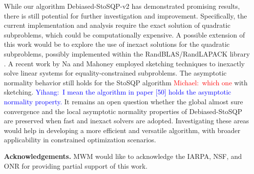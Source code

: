 \documentclass[aos]{imsart}
\numberwithin{equation}{section}
\theoremstyle{plain}
\newcommand{\michael}[1]{\textcolor{red}{Michael:\ #1}}
\newcommand{\yihang}[1]{\textcolor{blue}{Yihang:\ #1}}
\begin{document}
While our algorithm Debiased-StoSQP-v2 has demonstrated promising results, there is still potential for further investigation and improvement. 
Specifically, the current implementation and analysis require the exact solution of quadratic subproblems, which could be computationally expensive. 
A possible extension of this work would be to explore the use of inexact solutions for the quadratic subproblems, possibly implemented within the RandBLAS/RandLAPACK library \cite{randlapack_book_v2_arxiv}. 
A recent work by Na and Mahoney \cite{na2022asymptotic} employed sketching techniques to inexactly solve linear systems for equality-constrained subproblems. 
The asymptotic normality behavior still holds for the StoSQP algorithm 
\michael{which one}
with sketching. 
\yihang{I mean the algorithm in paper [50] holds the asymptotic normality property.}
It remains an open question whether the global almost sure convergence and the local asymptotic normality properties of Debiased-StoSQP are preserved when fast and inexact solvers are adopted.
Investigating these areas would help in developing a more efficient and versatile algorithm, with broader applicability in constrained optimization scenarios.


\vspace{5mm}
\noindent
\textbf{Acknowledgements.}
MWM would like to acknowledge the IARPA, NSF, and ONR for providing partial support of this work.



\end{document}
